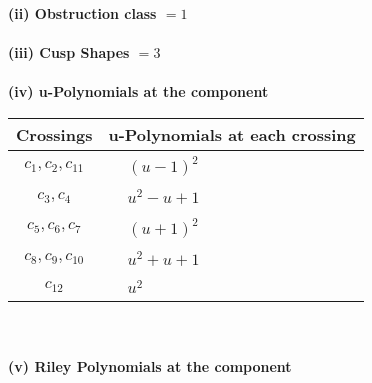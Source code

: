 \documentclass[1p]{elsarticle_modified}
\theoremstyle{definition}
\begin{document}
\flushleft \textbf{(ii) Obstruction class $= 1$}\\~\\
\flushleft \textbf{(iii) Cusp Shapes $= 3$}\\~\\
\newpage\renewcommand{\arraystretch}{1}
\flushleft \textbf{(iv) u-Polynomials at the component}\newline \\
\begin{tabular}{m{50pt}|m{274pt}}
Crossings & \hspace{64pt}u-Polynomials at each crossing \\
\hline $$\begin{aligned}c_{1},c_{2},c_{11}\end{aligned}$$&$\begin{aligned}
&(u-1)^2
\end{aligned}$\\
\hline $$\begin{aligned}c_{3},c_{4}\end{aligned}$$&$\begin{aligned}
&u^2- u+1
\end{aligned}$\\
\hline $$\begin{aligned}c_{5},c_{6},c_{7}\end{aligned}$$&$\begin{aligned}
&(u+1)^2
\end{aligned}$\\
\hline $$\begin{aligned}c_{8},c_{9},c_{10}\end{aligned}$$&$\begin{aligned}
&u^2+u+1
\end{aligned}$\\
\hline $$\begin{aligned}c_{12}\end{aligned}$$&$\begin{aligned}
&u^2
\end{aligned}$\\
\hline
\end{tabular}\\~\\
\newpage\renewcommand{\arraystretch}{1}
\flushleft \textbf{(v) Riley Polynomials at the component}\newline \\
\end{document}
